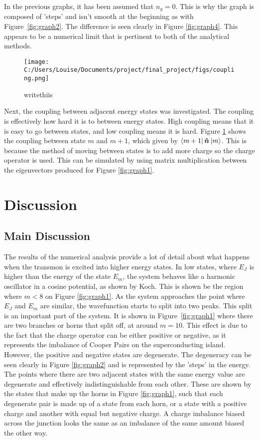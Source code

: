 \documentclass[11pt]{article}
\begin{document}
In the previous graphs, it has been assumed that $n_g = 0$. This is why the graph is composed of 'steps' and isn't smooth at the beginning as with Figure~\ref{fig:graph2}. The difference is seen clearly in Figure  \ref{fig:graph4}. This appears to be a numerical limit that is pertinent to both of the analytical methods.

\begin{figure}[ht]
\centering
\texttt{[image: C:/Users/Louise/Documents/project/final\_project/figs/coupling.png]}
\caption{writethiis}
\label{fig:graph5}
\end{figure}
Next, the coupling between adjacent energy states was investigated. The coupling is effectively how hard it is to between energy states. High coupling means that it is easy to go between states, and low coupling means it is hard. Figure \ref{fig:graph5} shows the coupling between state $m$ and $m+1$, which given by $\bra{m+1}\boldsymbol{\hat{n}}\ket{m}$. This is because the method of moving between states is to add more charge so the charge operator is used. This can be simulated by using matrix multiplication between the eigenvectors produced for Figure \ref{fig:graph1}.

\section{Discussion}
\subsection{Main Discussion}
The results of the numerical analysis provide a lot of detail about what happens when the transmon is excited into higher energy states. In low states, where $E_J$ is higher than the energy of the state $E_m$, the system behaves like a harmonic oscillator in a cosine potential, as shown by Koch. This is shown be the region where $m<8$ on Figure \ref{fig:graph1}. As the system approaches the point where $E_J$ and $E_m$ are similar, the wavefunction starts to split into two peaks. This split is an important part of the system. It is shown in Figure~\ref{fig:graph1} where there are two branches or horns that split off, at around $m=10$. This effect is due to the fact that the charge operator can be either positive or negative, as it represents the imbalance of Cooper Pairs on the superconducting island. However, the positive and negative states are degenerate. The degeneracy can be seen clearly in Figure \ref{fig:graph2} and is represented by the 'steps' in the energy. The points where there are two adjacent states with the same energy value are degenerate and effectively indistinguishable from each other. These are shown by the states that make up the horns in Figure \ref{fig:graph1}, such that each degenerate pair is made up of a state from each horn, or a state with a positive charge and another with equal but negative charge. A charge imbalance biased across the junction looks the same as an imbalance of the same amount biased the other way.
\end{document}

